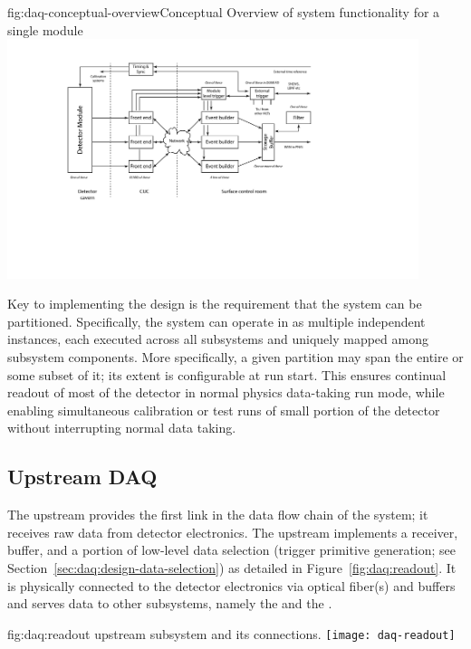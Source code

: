 \begin{dunefigure}{fig:daq-conceptual-overview}{Conceptual
   Overview of  system functionality for a single \nominalmodsize module}
  \includegraphics[width=0.9\textwidth]{daq-overview.pdf}
\end{dunefigure}

Key to implementing the  design is the requirement that
the system can be partitioned. Specifically, the system can operate in
as multiple independent  instances, each 
executed across all  subsystems and uniquely mapped among subsystem components. 
More specifically, a given partition may span the entire 
 or some subset of it; its extent is configurable at
run start. This ensures continual readout of most of the detector in normal physics data-taking run mode, while
enabling simultaneous calibration or test runs of small portion of the
detector without interrupting normal data taking. 

\subsection{Upstream DAQ}
\label{sec:daq:design-upstream}

The upstream  provides the first link in the data flow chain of
the  system; it receives raw data from detector electronics.
The upstream  implements a receiver, buffer, and a portion of low-level data
selection (trigger primitive generation; see Section~\ref{sec:daq:design-data-selection}) as detailed in Figure~\ref{fig:daq:readout}.
It is physically connected to the detector electronics via optical
fiber(s) and buffers and serves data to other  subsystems,
namely the  and the .

\begin{dunefigure}{fig:daq:readout}{ upstream  subsystem and its connections.}
  \texttt{[image: daq-readout]}
\end{dunefigure}

